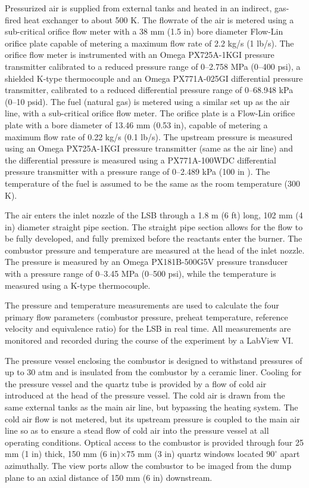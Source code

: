 

Pressurized air is supplied from external tanks and heated in an indirect, gas-fired heat exchanger to about 500 K.
The flowrate of the air is metered using a sub-critical orifice flow meter with a 38 mm (1.5 in) bore diameter Flow-Lin orifice plate capable of metering a maximum flow rate of 2.2 kg/s (1 lb/s).
The orifice flow meter is instrumented with an Omega PX725A-1KGI pressure transmitter calibrated to a reduced pressure range of 0--2.758 MPa (0--400 psi), a shielded K-type thermocouple and an Omega PX771A-025GI differential pressure transmitter, calibrated to a reduced differential pressure range of 0--68.948 kPa (0--10 psid).
The fuel (natural gas) is metered using a similar set up as the air line, with a sub-critical orifice flow meter.
The orifice plate is a Flow-Lin orifice plate with a bore diameter of 13.46 mm (0.53 in), capable of metering a maximum flow rate of 0.22 kg/s (0.1 lb/s).
The upstream pressure is measured using an Omega PX725A-1KGI pressure transmitter (same as the air line) and the differential pressure is measured using a PX771A-100WDC differential pressure transmitter with a pressure range of 0--2.489 kPa (100 in ).
The temperature of the fuel is assumed to be the same as the room temperature (300 K).

The air enters the inlet nozzle of the LSB through a 1.8 m (6 ft) long, 102 mm (4 in) diameter straight pipe section.
The straight pipe section allows for the flow to be fully developed, and fully premixed before the reactants enter the burner.
The combustor pressure and temperature are measured at the head of the inlet nozzle.
The pressure is measured by an Omega PX181B-500G5V pressure transducer with a pressure range of 0--3.45 MPa (0--500 psi), while the temperature is measured using a K-type thermocouple.

The pressure and temperature measurements are used to calculate the four primary flow parameters (combustor pressure, preheat temperature, reference velocity and equivalence ratio) for the LSB in real time.
All measurements are monitored and recorded during the course of the experiment by a LabView VI.

The pressure vessel enclosing the combustor is designed to withstand pressures of up to 30 atm and is insulated from the combustor by a ceramic liner.
Cooling for the pressure vessel and the quartz tube is provided by a flow of cold air introduced at the head of the pressure vessel.
The cold air is drawn from the same external tanks as the main air line, but bypassing the heating system.
The cold air flow is not metered, but its upstream pressure is coupled to the main air line so as to ensure a stead flow of cold air into the pressure vessel at all operating conditions.
Optical access to the combustor is provided through four 25 mm (1 in) thick, 150 mm (6 in)\(\times\)75 mm (3 in) quartz windows located \(90^\circ\) apart azimuthally.
The view ports allow the combustor to be imaged from the dump plane to an axial distance of 150 mm (6 in) downstream.

